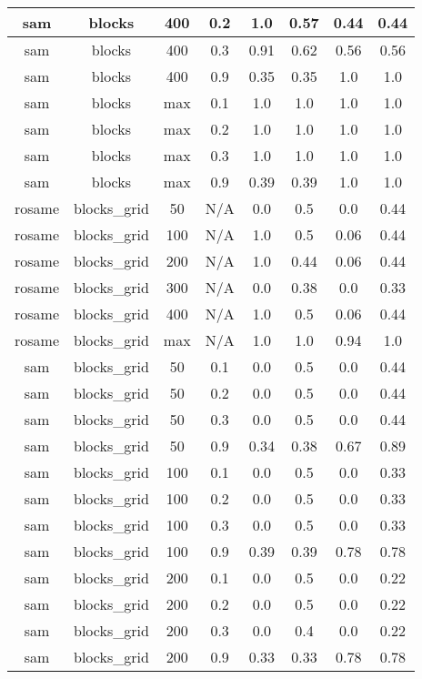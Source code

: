 \begin{table}[ht]
\begin{tabular}{c|c|c|c|c|c|c|c}
sam & blocks & 400 & 0.2 & 1.0 & 0.57 & 0.44 & 0.44 \\ \hline
sam & blocks & 400 & 0.3 & 0.91 & 0.62 & 0.56 & 0.56 \\ \hline
sam & blocks & 400 & 0.9 & 0.35 & 0.35 & 1.0 & 1.0 \\ \hline
sam & blocks & max & 0.1 & 1.0 & 1.0 & 1.0 & 1.0 \\ \hline
sam & blocks & max & 0.2 & 1.0 & 1.0 & 1.0 & 1.0 \\ \hline
sam & blocks & max & 0.3 & 1.0 & 1.0 & 1.0 & 1.0 \\ \hline
sam & blocks & max & 0.9 & 0.39 & 0.39 & 1.0 & 1.0 \\ \hline
rosame & blocks_grid & 50 & N/A & 0.0 & 0.5 & 0.0 & 0.44 \\ \hline
rosame & blocks_grid & 100 & N/A & 1.0 & 0.5 & 0.06 & 0.44 \\ \hline
rosame & blocks_grid & 200 & N/A & 1.0 & 0.44 & 0.06 & 0.44 \\ \hline
rosame & blocks_grid & 300 & N/A & 0.0 & 0.38 & 0.0 & 0.33 \\ \hline
rosame & blocks_grid & 400 & N/A & 1.0 & 0.5 & 0.06 & 0.44 \\ \hline
rosame & blocks_grid & max & N/A & 1.0 & 1.0 & 0.94 & 1.0 \\ \hline
sam & blocks_grid & 50 & 0.1 & 0.0 & 0.5 & 0.0 & 0.44 \\ \hline
sam & blocks_grid & 50 & 0.2 & 0.0 & 0.5 & 0.0 & 0.44 \\ \hline
sam & blocks_grid & 50 & 0.3 & 0.0 & 0.5 & 0.0 & 0.44 \\ \hline
sam & blocks_grid & 50 & 0.9 & 0.34 & 0.38 & 0.67 & 0.89 \\ \hline
sam & blocks_grid & 100 & 0.1 & 0.0 & 0.5 & 0.0 & 0.33 \\ \hline
sam & blocks_grid & 100 & 0.2 & 0.0 & 0.5 & 0.0 & 0.33 \\ \hline
sam & blocks_grid & 100 & 0.3 & 0.0 & 0.5 & 0.0 & 0.33 \\ \hline
sam & blocks_grid & 100 & 0.9 & 0.39 & 0.39 & 0.78 & 0.78 \\ \hline
sam & blocks_grid & 200 & 0.1 & 0.0 & 0.5 & 0.0 & 0.22 \\ \hline
sam & blocks_grid & 200 & 0.2 & 0.0 & 0.5 & 0.0 & 0.22 \\ \hline
sam & blocks_grid & 200 & 0.3 & 0.0 & 0.4 & 0.0 & 0.22 \\ \hline
sam & blocks_grid & 200 & 0.9 & 0.33 & 0.33 & 0.78 & 0.78 \\ \hline

\end{tabular}
\end{table}
